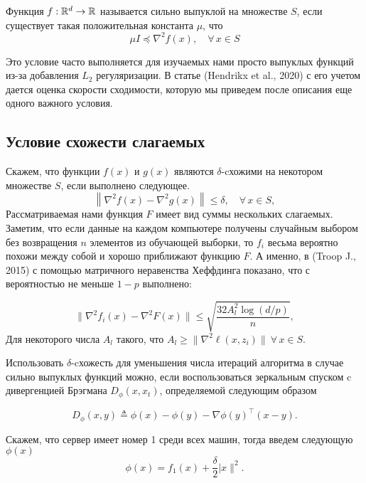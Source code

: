 \documentclass[a4paper,12pt]{extarticle}
\begin{document}
Функция $f:\mathbb{R}^d\to\mathbb{R}$ называется сильно выпуклой на множестве $S$, если существует такая положительная константа $\mu$, что 
\begin{equation}\label{eqn:strong_convex}   
    \mu I \preceq \nabla^2 f(x), \quad \forall\, x\in S
\end{equation}

Это условие часто выполняется для изучаемых нами просто выпуклых функций из-за добавления $L_2$ регуляризации.
В статье (Hendrikx et al., 2020)\cite{Hendrikx-paper} с его учетом дается оценка скорости сходимости,
которую мы приведем после описания еще одного важного условия. 

\subsection{Условие схожести слагаемых}
 Скажем, что функции $f(x)$ и $g(x)$ являются $\delta$-cхожими на некотором множестве $S$, если выполнено следующее. 
 \begin{equation}\label{eqn:Hessian-approx-mu}
    \left\|\nabla^2 f(x) - \nabla^2 g(x)\right\| \leq \delta, 
    \quad \forall\, x\in S,
\end{equation}
Рассматриваемая нами функция $F$ имеет вид суммы нескольких слагаемых.
Заметим, что если данные на каждом компьютере получены случайным выбором без возвращения $n$ элементов из обучающей выборки,
то $f_i$ весьма вероятно похожи между собой и хорошо приближают функцию $F$.
А именно, в (Troop J., 2015)\cite{Troop-paper} с помощью матричного неравенства Хеффдинга показано,
что с вероятностью не меньше $1-p$ выполнено:

\begin{equation}\label{eqn:matrix-hoeffding}
    \biggl\|\nabla^2f_i(x)\!-\!\nabla^2 F(x)\biggr\|
    \!\leq\! \sqrt{\frac{32 A_l^2 \log(d/p)}{n}},
\end{equation}
Для некоторого числа $A_l$ такого, что $A_l \geq \|\nabla^2\ell(x,z_i)\| \ \forall\, x\in S$.


Использовать $\delta$-cхожесть для уменьшения числа итераций алгоритма в случае сильно выпуклых функций можно,
если воспользоваться зеркальным спуском c дивергенцией Брэгмана $D_{\phi}(x, x_t)$, определяемой следующим образом


\begin{equation}\label{eqn:Bregman-def}
    D_\phi(x, y) \triangleq \phi(x) - \phi(y) - \nabla \phi(y)^\top(x - y).
\end{equation}


Скажем, что сервер имеет номер 1 среди всех машин, тогда введем следующую $\phi(x)$
\begin{equation}\label{eqn:reference-def}
    \phi(x) = f_1(x) + \frac{\delta}{2}|x\|^2.
\end{equation}
\end{document}
